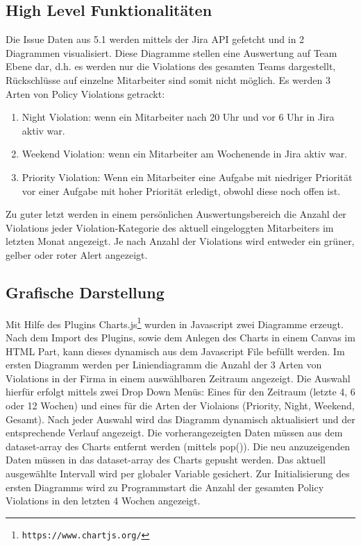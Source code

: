 \documentclass[a4paper,12pt,]{article}
\begin{document}
\subsection{High Level Funktionalitäten}
Die Issue Daten aus 5.1 werden mittels der Jira API gefetcht und in 2 Diagrammen visualisiert. Diese Diagramme stellen eine Auswertung auf Team Ebene dar, d.h. es werden nur die Violations des gesamten Teams dargestellt, Rückschlüsse auf einzelne Mitarbeiter sind somit nicht möglich. Es werden 3 Arten von Policy Violations getrackt:
\begin{enumerate}

\item Night Violation: wenn ein Mitarbeiter nach 20 Uhr und vor 6 Uhr in Jira aktiv war.
\item Weekend Violation: wenn ein Mitarbeiter am Wochenende in Jira aktiv war.
\item  Priority Violation: Wenn ein Mitarbeiter eine Aufgabe mit niedriger Priorität vor einer Aufgabe mit hoher Priorität erledigt, obwohl diese noch offen ist.

\end{enumerate}
Zu guter letzt werden in einem persönlichen Auswertungsbereich die Anzahl der Violations jeder Violation-Kategorie des aktuell eingeloggten Mitarbeiters im letzten Monat angezeigt. Je nach Anzahl der Violations wird entweder ein grüner, gelber oder roter Alert angezeigt.

\subsection{Grafische Darstellung}
Mit Hilfe des Plugins Charts.js\footnote{\tt https://www.chartjs.org/} wurden in Javascript zwei Diagramme erzeugt.
Nach dem Import des Plugins, sowie dem Anlegen des Charts in einem Canvas im HTML Part, kann dieses dynamisch aus dem Javascript File befüllt werden.
Im ersten Diagramm werden per Liniendiagramm die Anzahl der 3 Arten von Violations in der Firma in einem auswählbaren Zeitraum angezeigt. Die Auswahl hierfür erfolgt mittels zwei Drop Down Menüs: Eines für den Zeitraum (letzte 4, 6 oder 12 Wochen) und eines für die Arten der Violaions (Priority, Night, Weekend, Gesamt). Nach jeder Auswahl wird das Diagramm dynamisch aktualisiert und der entsprechende Verlauf angezeigt.
Die vorherangezeigten Daten müssen aus dem dataset-array des Charts entfernt werden (mittels pop()). Die neu anzuzeigenden Daten müssen in das dataset-array des Charts gepusht werden.
Das aktuell ausgewählte Intervall wird per globaler Variable gesichert.
Zur Initialisierung des ersten Diagramms wird zu Programmstart die Anzahl der gesamten Policy Violations in den letzten 4 Wochen angezeigt.
\end{document}
